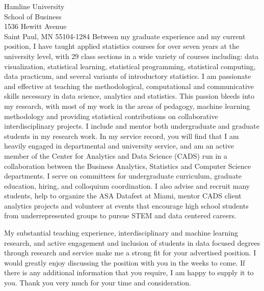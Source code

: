 \documentclass[11pt]{letter}\usepackage[]{graphicx}\usepackage[]{color}
\begin{document}
\begin{letter}{Hamline University\\
School of Business\\
1536 Hewitt Avenue\\
Saint Paul, MN 55104-1284
}
Between my graduate experience and my current position, I have taught applied statistics courses for over seven years at the university level, with 29 class sections in a wide variety of courses including: data visualization, statistical learning, statistical programming, statistical computing, data practicum, and several variants of introductory statistics. I am passionate and effective at teaching the methodological, computational and communicative skills necessary in data science, analytics and statistics. This passion bleeds into my research, with most of my work in the areas of pedagogy, machine learning methodology and providing statistical contributions on collaborative interdisciplinary projects. I include and mentor both undergraduate and graduate students in my research work. In my service record, you will find that I am heavily engaged in departmental and university service, and am an active member of the Center for Analytics and Data Science (CADS) run in a collaboration between the Business Analytics, Statistics and Computer Science departments. I serve on committees for undergraduate curriculum, graduate education, hiring, and colloquium coordination. I also advise and recruit many students, help to organize the ASA Datafest at Miami, mentor CADS client analytics projects and volunteer at events that encourage high school students from underrepresented groups to pursue STEM and data centered careers. 


My substantial teaching experience, interdisciplinary and machine learning research, and active engagement and inclusion of students in data focused degrees through research and service make me a strong fit for your advertised position. I would greatly enjoy discussing the position with you in the weeks to come. If there is any additional information that you require, I am happy to supply it to you. Thank you very much for your time and consideration.


\end{letter}
\end{document}
